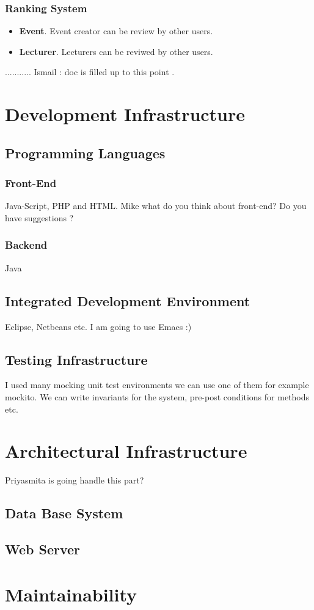  \subsubsection{Ranking System}
  \begin{itemize}
 \item \textbf{Event}. Event creator can be review by other users.
 \item \textbf{Lecturer}. Lecturers can be reviwed by other users.
  \end{itemize}
........... Ismail : doc is filled up to this point .
  
\section{Development Infrastructure}
\subsection{Programming Languages}
\subsubsection{Front-End} Java-Script, PHP and HTML. Mike what do you think about front-end? Do you have suggestions ?
\subsubsection{Backend} Java
 \subsection{Integrated Development Environment} Eclipse, Netbeans etc. I am going to use Emacs :)
 \subsection{Testing Infrastructure} I used many mocking unit test environments we can use one of them for example mockito. We can write invariants for the system, pre-post conditions for methods etc.  
\section{Architectural Infrastructure} Priyasmita is going handle this part?
 \subsection{Data Base System}
 \subsection{Web Server}
\section{Maintainability}

